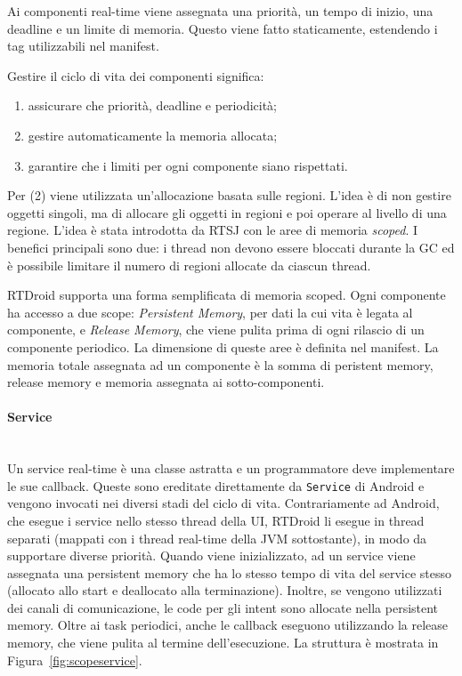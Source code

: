 Ai componenti real-time viene assegnata una priorità, un tempo di inizio, una deadline e un limite di memoria. Questo viene fatto staticamente, estendendo i tag utilizzabili nel manifest.

Gestire il ciclo di vita dei componenti significa: 
\begin{enumerate}
	\item assicurare che priorità, deadline e periodicità;
	\item gestire automaticamente la memoria allocata;
	\item garantire che i limiti per ogni componente siano rispettati.
\end{enumerate}
Per (2) viene utilizzata un'allocazione basata sulle regioni. L'idea è di non gestire oggetti singoli, ma di allocare gli oggetti in regioni e poi operare al livello di una regione. L'idea è stata introdotta da RTSJ con le aree di memoria \textit{scoped}. I benefici principali sono due: i thread non devono essere bloccati durante la GC ed è possibile limitare il numero di regioni allocate da ciascun thread.

RTDroid supporta una forma semplificata di memoria scoped. Ogni componente ha accesso a due scope: \textit{Persistent Memory}, per dati la cui vita è legata al componente, e \textit{Release Memory}, che viene pulita prima di ogni rilascio di un componente periodico. La dimensione di queste aree è definita nel manifest. La memoria totale assegnata ad un componente è la somma di peristent memory, release memory e memoria assegnata ai sotto-componenti.

\paragraph{Service} \mbox{} \\
Un service real-time è una classe astratta e un programmatore deve implementare le sue callback. Queste sono ereditate direttamente da \texttt{Service} di Android e vengono invocati nei diversi stadi del ciclo di vita. Contrariamente ad Android, che esegue i service nello stesso thread della UI, RTDroid li esegue in thread separati (mappati con i thread real-time della JVM sottostante), in modo da supportare diverse priorità. Quando viene inizializzato, ad un service viene assegnata una persistent memory che ha lo stesso tempo di vita del service stesso (allocato allo start e deallocato alla terminazione). Inoltre, se vengono utilizzati dei canali di comunicazione, le code per gli intent sono allocate nella persistent memory. Oltre ai task periodici, anche le callback eseguono utilizzando la release memory, che viene pulita al termine dell'esecuzione. La struttura è mostrata in Figura~\ref{fig:scopeservice}.

